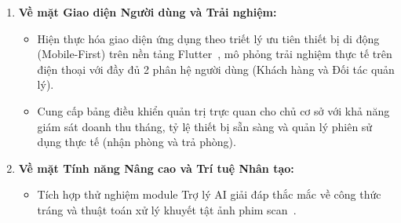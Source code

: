 \begin{enumerate}[leftmargin=2em]
    \item \textbf{Về mặt Giao diện Người dùng và Trải nghiệm:}
    \begin{itemize}
        \item Hiện thực hóa giao diện ứng dụng theo triết lý ưu tiên thiết bị di động (Mobile-First) trên nền tảng Flutter~\cite{alzewairi2024critical}, mô phỏng trải nghiệm thực tế trên điện thoại với đầy đủ 2 phân hệ người dùng (Khách hàng và Đối tác quản lý).
        \item Cung cấp bảng điều khiển quản trị trực quan cho chủ cơ sở với khả năng giám sát doanh thu tháng, tỷ lệ thiết bị sẵn sàng và quản lý phiên sử dụng thực tế (nhận phòng và trả phòng).
    \end{itemize}

    \item \textbf{Về mặt Tính năng Nâng cao và Trí tuệ Nhân tạo:}
    \begin{itemize}
        \item Tích hợp thử nghiệm module Trợ lý AI giải đáp thắc mắc về công thức tráng và thuật toán xử lý khuyết tật ảnh phim scan~\cite{wan2023old, su2024deep}.
    \end{itemize}
\end{enumerate}
